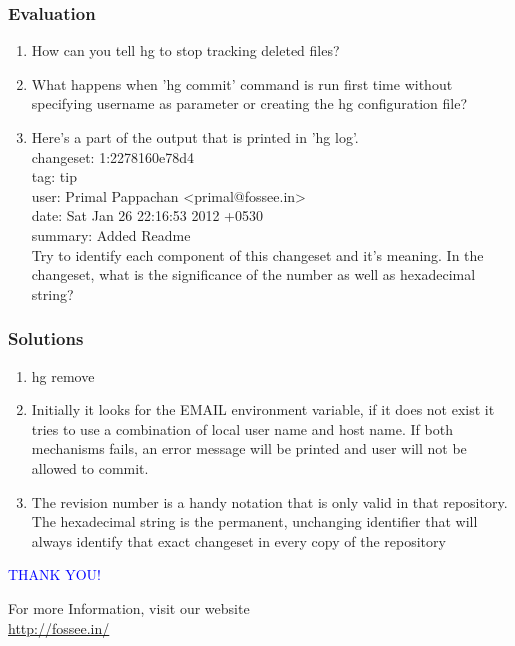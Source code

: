\documentclass[14pt,compress]{beamer}
\begin{document}
\begin{frame}[fragile]
\frametitle{Evaluation}
\begin{enumerate}
\item \small{How can you tell hg to stop tracking deleted files?}
\item \small{What happens when 'hg commit' command is run first time without specifying username as parameter or creating the hg configuration file?}
\item \small{ Here's a part of the output that is printed in 'hg log'.\\}
\tiny{
	changeset:   1:2278160e78d4 \\
	tag:         tip \\
	user:        Primal Pappachan <primal@fossee.in> \\
	date:        Sat Jan 26 22:16:53 2012 +0530 \\
	summary:     Added Readme \\}
\small{Try to identify each component of this changeset and it's meaning. In the changeset, what is the significance of the number as well as hexadecimal string?} 
\end{enumerate}
\end{frame}

\begin{frame}
\frametitle{Solutions}
\begin{enumerate}
\item \small{hg remove}
\item \small{Initially it looks for the EMAIL environment variable, if it does not exist 
it tries to use a combination of local user name and host name. If both 
mechanisms fails, an error message will be printed and user will not be 
allowed to commit.}
\item \small{The revision number is a handy notation that is only valid in that 
repository. The hexadecimal string is the permanent, unchanging identifier that 
will always identify that exact changeset in every copy of the repository} 	
\end{enumerate}
\end{frame}
\begin{frame}

\begin{block}{}
  \begin{center}
  \textcolor{blue}{\Large THANK YOU!} 
  \end{center}
  \end{block}
\begin{block}{}
  \begin{center}
    For more Information, visit our website\\
    \url{http://fossee.in/}
  \end{center}  
  \end{block}
\end{frame}
\end{document}
